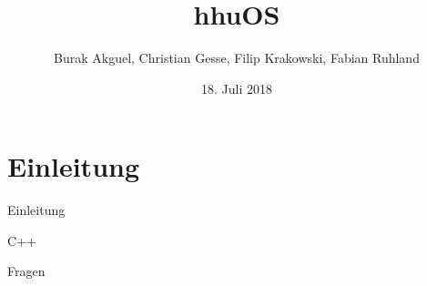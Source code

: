 \documentclass[german,aspectratio=169]{beamer}
\title{hhuOS}
\date{18. Juli 2018}
\author{Burak Akguel, Christian Gesse, Filip Krakowski, Fabian Ruhland}
\institute{Institut für Informatik \\
	Heinrich-Heine-Universität Düsseldorf}
\begin{document}
	
	\maketitle
	
	\section{Einleitung}
	
	\begin{frame}{Einleitung}
	
		\begin{bpbox}{C++}
		\end{bpbox}
		
	\end{frame}

	\begin{frame}[standout]
			\Large Fragen
	\end{frame}
\end{document}
